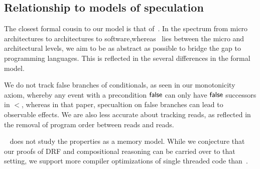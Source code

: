 \subsection{Relationship to models of speculation}
The closest formal cousin to our model is that of~\citet{2019-sp}.   In the spectrum from micro architectures to architectures to software,whereas~\citet{2019-sp} lies between the micro and architectural levels, we aim to be as abstract as possible to bridge the gap to programming languages.  This is reflected in the several differences in the formal model.  

We do not track false branches of conditionals, as seen in our monotonicity axiom, whereby any event with a precondition $\mathsf{false}$ can only have $\mathsf{false}$ successors in $\lt$, whereas in that paper, specualtion on false branches can lead to observable effects.   We are also less accurate  about tracking reads, as reflected in the removal of program order between reads and reads.   

~\citet{2019-sp} does not study the properties as a memory model.  While we conjecture that our proofs of DRF and compositional reasoning can be carried over to that setting, we support more compiler optimizations of single threaded code than~\citet{2019-sp}. 



